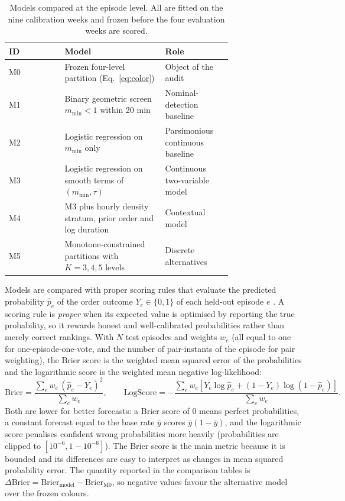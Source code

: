 \documentclass[pdflatex,sn-mathphys-num]{sn-jnl}
\newcommand{\mmin}{m_{\min}}
\begin{document}
\begin{table}[t]
\caption{Models compared at the episode level. All are fitted on the nine calibration weeks and frozen before the four evaluation weeks are scored.}\label{tab:models}
\begin{tabular}{@{}lp{0.45\linewidth}p{0.30\linewidth}@{}}
\toprule
ID & Model & Role\\
\midrule
M0 & Frozen four-level partition (Eq.~\eqref{eq:color}) & Object of the audit\\
M1 & Binary geometric screen $\mmin<1$ within 20 min & Nominal-detection baseline\\
M2 & Logistic regression on $\mmin$ only & Parsimonious continuous baseline\\
M3 & Logistic regression on smooth terms of $(\mmin,\tau)$ & Continuous two-variable model\\
M4 & M3 plus hourly density stratum, prior order and log duration & Contextual model\\
M5 & Monotone-constrained partitions with $K=3,4,5$ levels & Discrete alternatives\\
\bottomrule
\end{tabular}
\end{table}

Models are compared with proper scoring rules that evaluate the predicted probability $\hat p_e$ of the order outcome $Y_e\in\{0,1\}$ of each held-out episode $e$ \cite{gneiting2007}. A scoring rule is \emph{proper} when its expected value is optimised by reporting the true probability, so it rewards honest and well-calibrated probabilities rather than merely correct rankings. With $N$ test episodes and weights $w_e$ (all equal to one for one-episode-one-vote, and the number of pair-instants of the episode for pair weighting), the Brier score is the weighted mean squared error of the probabilities and the logarithmic score is the weighted mean negative log-likelihood:
\begin{equation}\label{eq:brier}
 \mathrm{Brier}=\frac{\sum_e w_e\,(\hat p_e-Y_e)^2}{\sum_e w_e},\qquad
 \mathrm{LogScore}=-\frac{\sum_e w_e\left[Y_e\log\hat p_e+(1-Y_e)\log(1-\hat p_e)\right]}{\sum_e w_e}.
\end{equation}
Both are lower for better forecasts: a Brier score of 0 means perfect probabilities, a constant forecast equal to the base rate $\bar y$ scores $\bar y(1-\bar y)$, and the logarithmic score penalises confident wrong probabilities more heavily (probabilities are clipped to $[10^{-6},1-10^{-6}]$). The Brier score is the main metric because it is bounded and its differences are easy to interpret as changes in mean squared probability error. The quantity reported in the comparison tables is $\Delta\mathrm{Brier}=\mathrm{Brier}_{\text{model}}-\mathrm{Brier}_{\mathrm{M0}}$, so negative values favour the alternative model over the frozen colours.
\end{document}
